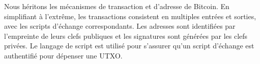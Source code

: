 \documentclass[letterpaper,twocolumn,10pt]{article}
\theoremstyle{definition}
\begin{document}
%
%
%    
%
Nous héritons les mécanismes de transaction et d'adresse de Bitcoin. En simplifiant à l'extrême, les transactions consistent en multiples entrées et sorties, avec les scripts d'échange correspondants.
Les adresses sont identifiées par l'empreinte de leurs clefs publiques et les signatures sont générées par les clefs privées.
Le langage de script est utilisé pour s'assurer qu'un script d'échange est authentifié pour dépenser une UTXO\@.
\end{document}
